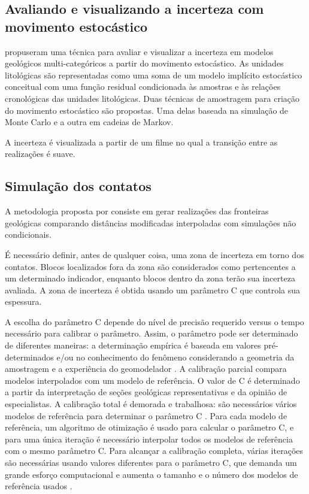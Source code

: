 \subsection{Avaliando e visualizando a incerteza com movimento estocástico}

 propuseram uma técnica para avaliar e visualizar a incerteza em modelos geológicos multi-categóricos a partir do movimento estocástico. As unidades litológicas são representadas como uma soma de um modelo implícito estocástico conceitual com uma função residual condicionada às amostras e às relações cronológicas das unidades litológicas. Duas técnicas de amostragem para criação do movimento estocástico são propostas. Uma delas baseada na simulação de Monte Carlo e a outra em cadeias de Markov.

A incerteza é visualizada a partir de um filme no qual a transição entre as realizações é suave.

\subsection{Simulação dos contatos}\label{boundsim}

A metodologia proposta por  consiste em gerar realizações das fronteiras geológicas comparando distâncias modificadas interpoladas com simulações não condicionais. 

É necessário definir, antes de qualquer coisa, uma zona de incerteza em torno dos contatos. Blocos localizados fora da zona são considerados como pertencentes a um determinado indicador, enquanto blocos dentro da zona terão sua incerteza avaliada. A zona de incerteza é obtida usando um parâmetro C que controla sua espessura.

A escolha do parâmetro C depende do nível de precisão requerido versus o tempo necessário para calibrar o parâmetro. Assim, o parâmetro pode ser determinado de diferentes maneiras: a determinação empírica é baseada em valores pré-determinados e/ou no conhecimento do fenômeno considerando a geometria da amostragem e a experiência do geomodelador \cite{kaperov}. A calibração parcial compara modelos interpolados com um modelo de referência. O valor de C é determinado a partir da interpretação de seções geológicas representativas e da opinião de especialistas. A calibração total é demorada e trabalhosa: são necessários vários modelos de referência para determinar o parâmetro C \cite{kaperov}. Para cada modelo de referência, um algoritmo de otimização é usado para calcular o parâmetro C, e para uma única iteração é necessário interpolar todos os modelos de referência com o mesmo parâmetro C. Para alcançar a calibração completa, várias iterações são necessárias usando valores diferentes para o parâmetro C, que demanda um grande esforço computacional e aumenta o tamanho e o número dos modelos de referência usados \cite{munroe2008full}.

